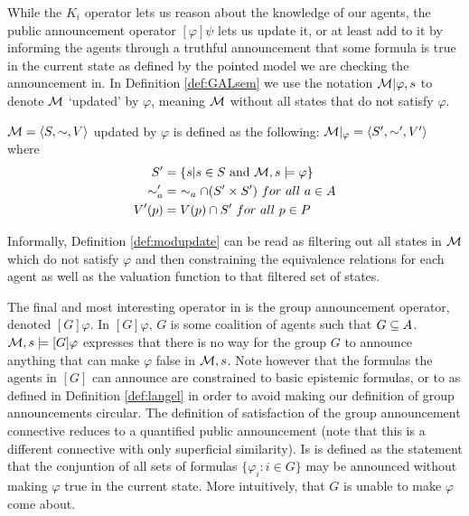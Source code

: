 While the $K_i$ operator lets us reason about the knowledge of our agents, the public announcement operator $[\varphi]\psi$ lets us update it, or at least add to it by informing the agents through a truthful announcement that some formula is true in the current state as defined by the pointed model we are checking the announcement in.
In Definition \ref{def:GALsem} we use the notation $\mathcal{M}|\varphi,s$ to denote $\mathcal{M}$ `updated' by $\varphi$, meaning $\mathcal{M}$ without all states that do not satisfy $\varphi$.

\begin{definition}
	\label{def:modupdate}
	$\mathcal{M} = \langle S,\sim,V\rangle$ updated by $\varphi$ is defined as the following: $\mathcal{M}|_\varphi = \langle S',\sim',V'\rangle$ where 
	\begin{align*}
			S' &= \{s| s\in S\textrm{ and }\mathcal{M},s \models\varphi\} \\
			\sim_a' &= ~\sim_a \cap (S' \times S')~ for ~ all ~ a\in A\\
			V'(p) &= V(p) \cap S'~ for ~ all ~ p \in P
	\end{align*}
\end{definition}

Informally, Definition \ref{def:modupdate} can be read as filtering out all states in $\mathcal{M}$ which do not satisfy $\varphi$ and then constraining the equivalence relations for each agent as well as the valuation function to that filtered set of states.

The final and most interesting operator in  is the group announcement operator, denoted $[G]\varphi$. In $[G]\varphi$, $G$ is some coalition of agents such that $G \subseteq A$. $\mathcal{M},s \models [G]\varphi$ expresses that there is no way for the group $G$ to announce anything that can make $\varphi$ false in $\mathcal{M},s$. Note however that the formulas the agents in $[G]$ can announce are constrained to basic epistemic formulas, or to  as defined in Definition \ref{def:langel} in order to avoid making our definition of group announcements circular. The definition of satisfaction of the group announcement connective reduces to a quantified public announcement (note that this is a different connective with only superficial similarity). Is is defined as the statement that the conjuntion of all sets of formulas $\{\varphi_i:i\in G\}$ may be announced without making $\varphi$ true in the current state. More intuitively, that $G$ is unable to make $\varphi$ come about.

